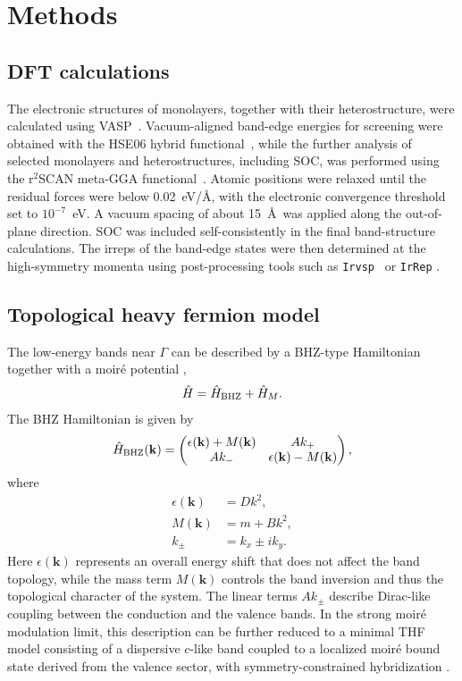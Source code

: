 \documentclass[aps, preprint, prb,]{revtex4-2}
\begin{document}
\section{Methods}

\subsection{DFT calculations}
The electronic structures of monolayers, together with their heterostructure, were calculated using VASP~\cite{kresse1996efficiency}. Vacuum-aligned band-edge energies for screening were obtained with the HSE06 hybrid functional~\cite{heyd2003hybrid}, while the further analysis of selected monolayers and heterostructures, including SOC, was performed using the r$^2$SCAN meta-GGA functional~\cite{furness2020accurate}. Atomic positions were relaxed until the residual forces were below 0.02~eV/\AA, with the electronic convergence threshold set to $10^{-7}$~eV. A vacuum spacing of about 15~\AA\ was applied along the out-of-plane direction. SOC was included self-consistently in the final band-structure calculations. The irreps of the band-edge states were then determined at the high-symmetry momenta using post-processing tools such as \texttt{Irvsp}~\cite{Gao2021Irvsp} or \texttt{IrRep} \cite{Iraola2022IrRep}. 

\subsection{Topological heavy fermion model}
\noindent The low-energy bands near $\Gamma$ can be described by a BHZ-type Hamiltonian together with a moir\'e potential \cite{Bernevig2006QSH, Liu2025IdealTHF},
\begin{equation}
\hat{H} = \hat{H}_{\rm BHZ} + \hat{H}_M .
\end{equation}
The BHZ Hamiltonian is given by
\begin{equation}
\hat{H}_{\rm BHZ}(\mathbf{k}) =
\begin{pmatrix}
\epsilon(\mathbf{k}) + M(\mathbf{k}) & A k_+ \\
A k_- & \epsilon(\mathbf{k}) - M(\mathbf{k})
\end{pmatrix},
\label{eq:BHZ}
\end{equation}
where
\begin{align}
\epsilon(\mathbf{k}) &= D k^2 , \\
M(\mathbf{k}) &= m + B k^2 , \\
k_\pm &= k_x \pm i k_y .
\end{align}
Here $\epsilon(\mathbf{k})$ represents an overall energy shift that does not affect the band topology, while the mass term $M(\mathbf{k})$ controls the band inversion and thus the topological character of the system. The linear terms $A k_\pm$ describe Dirac-like coupling between the conduction and the valence bands. In the strong moir\'e modulation limit, this description can be further reduced to a minimal THF model consisting of a dispersive $c$-like band coupled to a localized moir\'e bound state derived from the valence sector, with symmetry-constrained hybridization \cite{Liu2025IdealTHF}.
\end{document}
